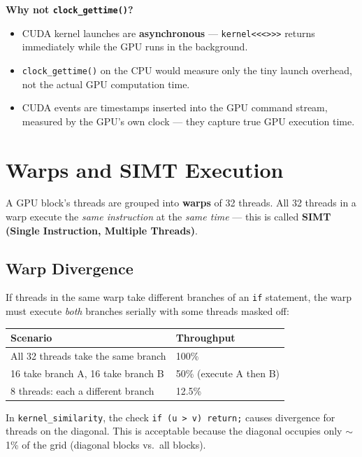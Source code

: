 \documentclass[12pt,a4paper]{article}
\begin{document}
\textbf{Why not \texttt{clock\_gettime()}?}
\begin{itemize}
    \item CUDA kernel launches are \textbf{asynchronous} — \texttt{kernel<<<>>>}
          returns immediately while the GPU runs in the background.
    \item \texttt{clock\_gettime()} on the CPU would measure only the tiny
          launch overhead, not the actual GPU computation time.
    \item CUDA events are timestamps inserted into the GPU command stream,
          measured by the GPU's own clock — they capture true GPU execution time.
\end{itemize}

\section{Warps and SIMT Execution}

A GPU block's threads are grouped into \textbf{warps} of 32 threads.
All 32 threads in a warp execute the \emph{same instruction} at the
\emph{same time} — this is called \textbf{SIMT (Single Instruction,
Multiple Threads)}.

\subsection{Warp Divergence}

If threads in the same warp take different branches of an \texttt{if}
statement, the warp must execute \emph{both} branches serially with some
threads masked off:

\begin{center}
\begin{tabular}{ll}
\toprule
Scenario & Throughput \\
\midrule
All 32 threads take the same branch & 100\% \\
16 take branch A, 16 take branch B & 50\% (execute A then B) \\
8 threads: each a different branch & 12.5\% \\
\bottomrule
\end{tabular}
\end{center}

In \texttt{kernel\_similarity}, the check \texttt{if (u > v) return;} causes
divergence for threads on the diagonal.  This is acceptable because the
diagonal occupies only $\sim$1\% of the grid (diagonal blocks vs.\ all blocks).
\end{document}
